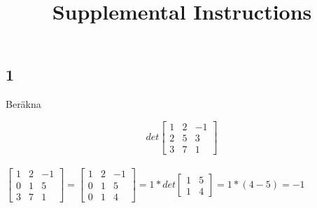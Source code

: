 \documentclass{article}
\title{Supplemental Instructions}
\date{
     }
\begin{document}
\maketitle


\subsection*{1}
Beräkna 

$$
det
\begin{bmatrix}
 1 & 2 & -1 \\
 2 & 5 & 3 \\
 3 & 7 & 1
\end{bmatrix}
$$
\\

$
\begin{bmatrix}
 1 & 2 & -1 \\
 0 & 1 & 5 \\
 3 & 7 & 1
\end{bmatrix}
=
\begin{bmatrix}
 1 & 2 & -1 \\
 0 & 1 & 5 \\
 0 & 1 & 4
\end{bmatrix}
= 
1 * det
\begin{bmatrix}
 1 & 5 \\
 1 & 4
\end{bmatrix}
= 1 * (4-5) = -1
$
\end{document}
